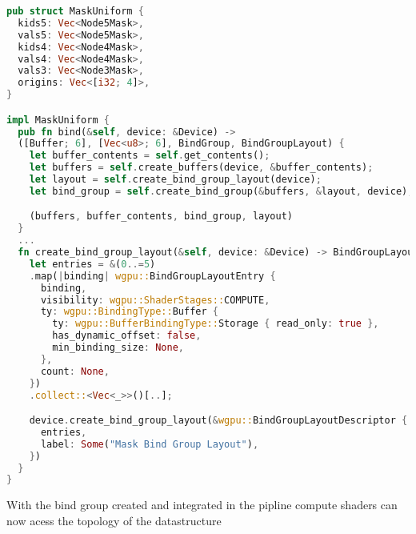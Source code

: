 \begin{lstlisting}[language=rust, captionpos=b, caption={
    \texttt{MaskUniform} defintion: Each type of mask list is a separate binding. And additional binding created to store the origins of the top leval Node5 nodes.
    \texttt{MaskUniform} implementation: The \texttt{bind} method generates all data needed to pass the mask group to compute shaders. The \texttt{create\_bind\_group\_layout}
    function is the crtical part of this process, each binding is a storage buffer type with read-only access.
}]
pub struct MaskUniform {
  kids5: Vec<Node5Mask>,
  vals5: Vec<Node5Mask>,
  kids4: Vec<Node4Mask>,
  vals4: Vec<Node4Mask>,
  vals3: Vec<Node3Mask>,
  origins: Vec<[i32; 4]>,
}

impl MaskUniform {
  pub fn bind(&self, device: &Device) ->
  ([Buffer; 6], [Vec<u8>; 6], BindGroup, BindGroupLayout) {
    let buffer_contents = self.get_contents();
    let buffers = self.create_buffers(device, &buffer_contents);
    let layout = self.create_bind_group_layout(device);
    let bind_group = self.create_bind_group(&buffers, &layout, device);

    (buffers, buffer_contents, bind_group, layout)
  }
  ...
  fn create_bind_group_layout(&self, device: &Device) -> BindGroupLayout {
    let entries = &(0..=5)
    .map(|binding| wgpu::BindGroupLayoutEntry {
      binding,
      visibility: wgpu::ShaderStages::COMPUTE,
      ty: wgpu::BindingType::Buffer {
        ty: wgpu::BufferBindingType::Storage { read_only: true },
        has_dynamic_offset: false,
        min_binding_size: None,
      },
      count: None,
    })
    .collect::<Vec<_>>()[..];

    device.create_bind_group_layout(&wgpu::BindGroupLayoutDescriptor {
      entries,
      label: Some("Mask Bind Group Layout"),
    })
  }
}
\end{lstlisting}

    With the bind group created and integrated in the pipline compute shaders can now acess the topology of the datastructure

